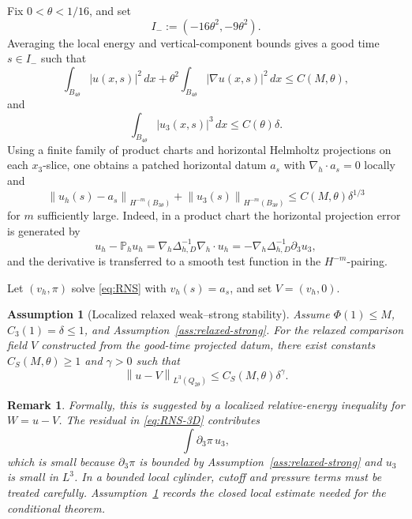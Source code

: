 \documentclass[pdflatex,sn-mathphys-num]{sn-jnl}
\numberwithin{equation}{section}
\theoremstyle{thmstyleone}
\newtheorem{assumption}[theorem]{Assumption}
\theoremstyle{thmstylethree}
\newtheorem{remark}[theorem]{Remark}
\newcommand{\dx}{\,dx}
\newcommand{\nabh}{\nabla_h}
\newcommand{\Ph}{\mathbb P_h}
\newcommand{\norm}[2]{\left\|#1\right\|_{#2}}
\begin{document}
Fix \(0<\theta<1/16\), and set
\[
        I_-:=(-16\theta^2,-9\theta^2).
\]
Averaging the local energy and vertical-component bounds gives a good time \(s\in I_-\) such that
\begin{equation}
        \int_{B_{4\theta}}|u(x,s)|^2\dx
        +\theta^2\int_{B_{4\theta}}|\nabla u(x,s)|^2\dx
        \le C(M,\theta),
        \label{eq:good-time-energy}
\end{equation}
and
\begin{equation}
        \int_{B_{4\theta}}|u_3(x,s)|^3\dx
        \le C(\theta)\delta.
        \label{eq:good-time-u3}
\end{equation}
Using a finite family of product charts and horizontal Helmholtz projections on each \(x_3\)-slice, one obtains a patched horizontal datum \(a_s\) with \(\nabh\cdot a_s=0\) locally and
\begin{equation}
        \norm{u_h(s)-a_s}{H^{-m}(B_{3\theta})}
        +\norm{u_3(s)}{H^{-m}(B_{3\theta})}
        \le C(M,\theta)\delta^{1/3}
        \label{eq:projection-error}
\end{equation}
for \(m\) sufficiently large.  Indeed, in a product chart the horizontal projection error is generated by
\[
        u_h-\Ph u_h
        =\nabh\Delta_{h,D}^{-1}\nabh\cdot u_h
        =-\nabh\Delta_{h,D}^{-1}\partial_3u_3,
\]
and the derivative is transferred to a smooth test function in the \(H^{-m}\)-pairing.

Let \((v_h,\pi)\) solve \eqref{eq:RNS} with \(v_h(s)=a_s\), and set \(V=(v_h,0)\).

\begin{assumption}[Localized relaxed weak--strong stability]
\label{ass:relaxed-stability}
Assume \(\Phi(1)\le M\), \(C_3(1)=\delta\le1\), and Assumption~\ref{ass:relaxed-strong}.  For the relaxed comparison field \(V\) constructed from the good-time projected datum, there exist constants \(C_S(M,\theta)\ge1\) and \(\gamma>0\) such that
\begin{equation}
        \norm{u-V}{L^3(Q_{2\theta})}
        \le C_S(M,\theta)\delta^\gamma.
        \label{eq:relaxed-stability}
\end{equation}
\end{assumption}

\begin{remark}
Formally, this is suggested by a localized relative-energy inequality for \(W=u-V\).  The residual in \eqref{eq:RNS-3D} contributes
\[
        \int \partial_3\pi\,u_3,
\]
which is small because \(\partial_3\pi\) is bounded by Assumption~\ref{ass:relaxed-strong} and \(u_3\) is small in \(L^3\).  In a bounded local cylinder, cutoff and pressure terms must be treated carefully.  Assumption~\ref{ass:relaxed-stability} records the closed local estimate needed for the conditional theorem.
\end{remark}
\end{document}
